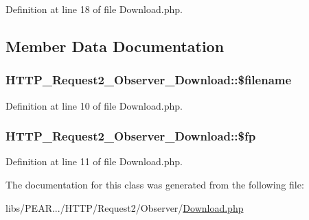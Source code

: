 Definition at line 18 of file Download.\-php.



\subsection{Member Data Documentation}
\hypertarget{classHTTP__Request2__Observer__Download_a8d465a7b54376270b909228207640680}{
\subsubsection[{\$filename}]{\setlength{\rightskip}{0pt plus 5cm}H\-T\-T\-P\-\_\-\-Request2\-\_\-\-Observer\-\_\-\-Download\-::\$filename\hspace{0.3cm}{\ttfamily [protected]}}}\label{classHTTP__Request2__Observer__Download_a8d465a7b54376270b909228207640680}


Definition at line 10 of file Download.\-php.

\hypertarget{classHTTP__Request2__Observer__Download_a25e23c48a242ef021c465dde71719183}{
\subsubsection[{\$fp}]{\setlength{\rightskip}{0pt plus 5cm}H\-T\-T\-P\-\_\-\-Request2\-\_\-\-Observer\-\_\-\-Download\-::\$fp\hspace{0.3cm}{\ttfamily [protected]}}}\label{classHTTP__Request2__Observer__Download_a25e23c48a242ef021c465dde71719183}


Definition at line 11 of file Download.\-php.



The documentation for this class was generated from the following file\-:\begin{DoxyCompactItemize}
\item 
libs/\-P\-E\-A\-R.../\-H\-T\-T\-P/\-Request2/\-Observer/\hyperlink{Download_8php}{Download.\-php}\end{DoxyCompactItemize}
